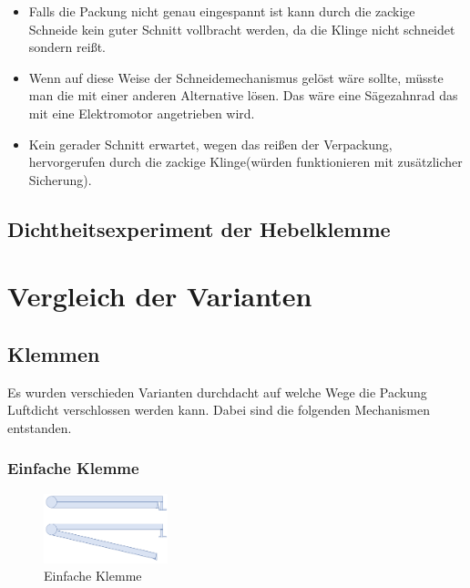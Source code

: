 \begin{itemize}
\item Falls die Packung nicht genau eingespannt ist kann durch die zackige Schneide kein guter Schnitt vollbracht werden, da die Klinge nicht schneidet sondern reißt.
\item Wenn auf diese Weise der Schneidemechanismus gelöst wäre sollte, müsste man die mit einer anderen Alternative lösen. Das wäre eine Sägezahnrad das mit eine Elektromotor angetrieben wird.
\item Kein gerader Schnitt erwartet, wegen das reißen der Verpackung, hervorgerufen durch die zackige Klinge(würden funktionieren mit zusätzlicher Sicherung). 
\end{itemize} 

\subsection{Dichtheitsexperiment der Hebelklemme}

\section{Vergleich der Varianten}
\subsection{Klemmen}

Es wurden verschieden Varianten durchdacht auf welche Wege die Packung Luftdicht verschlossen werden kann. Dabei sind die folgenden Mechanismen entstanden.

\subsubsection{Einfache Klemme}

\begin{figure}
\vspace{-20pt}
  \begin{center}
    \includegraphics[width=0.32\textwidth]{Bilder/Powerpoint/Einfach_Klemme}
  \end{center}
  \caption{Einfache Klemme}
  \label{Einfache Klemme}
  \vspace{-10pt}
\end{figure}

